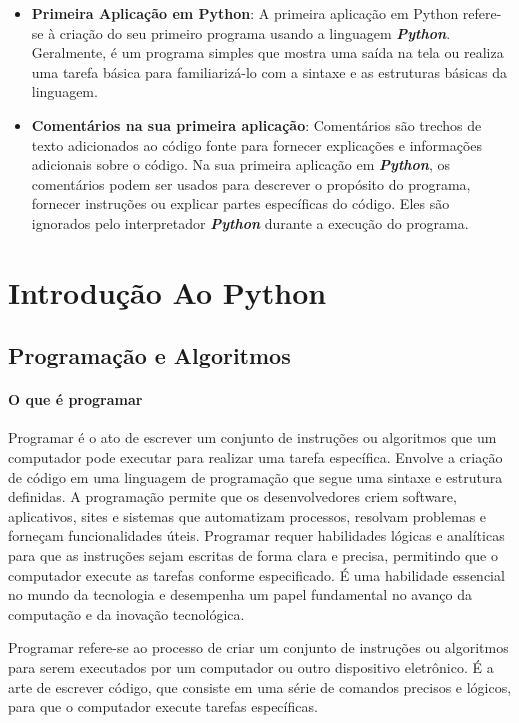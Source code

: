 \documentclass[a4paper, 12pt, onecolumn,singlespacing]{article}
\begin{document}
\begin{itemize}
		\item \textbf{Primeira Aplicação em Python}: A primeira aplicação em Python refere-se à criação do seu primeiro programa usando a linguagem \textit{\textbf{Python}}. Geralmente, é um programa simples que mostra uma saída na tela ou realiza uma tarefa básica para familiarizá-lo com a sintaxe e as estruturas básicas da linguagem.
		
		\item \textbf{Comentários na sua primeira aplicação}: Comentários são trechos de texto adicionados ao código fonte para fornecer explicações e informações adicionais sobre o código. Na sua primeira aplicação em \textit{\textbf{Python}}, os comentários podem ser usados para descrever o propósito do programa, fornecer instruções ou explicar partes específicas do código. Eles são ignorados pelo interpretador \textbf{\textit{Python}} durante a execução do programa.
		
	\end{itemize}
	
	\section{Introdução Ao Python}
	\label{intro_python}
	\subsection{Programação e Algoritmos}
	\label{programacao_e_algoritmos}
	
	\paragraph{O que é programar} \label{o_que_e_programar} Programar é o ato de escrever um conjunto de instruções ou algoritmos que um computador pode executar para realizar uma tarefa específica. Envolve a criação de código em uma linguagem de programação que segue uma sintaxe e estrutura definidas. A programação permite que os desenvolvedores criem software, aplicativos, sites e sistemas que automatizam processos, resolvam problemas e forneçam funcionalidades úteis. Programar requer habilidades lógicas e analíticas para que as instruções sejam escritas de forma clara e precisa, permitindo que o computador execute as tarefas conforme especificado. É uma habilidade essencial no mundo da tecnologia e desempenha um papel fundamental no avanço da computação e da inovação tecnológica.
	
	Programar refere-se ao processo de criar um conjunto de instruções ou algoritmos para serem executados por um computador ou outro dispositivo eletrônico. É a arte de escrever código, que consiste em uma série de comandos precisos e lógicos, para que o computador execute tarefas específicas.
	
\end{document}
